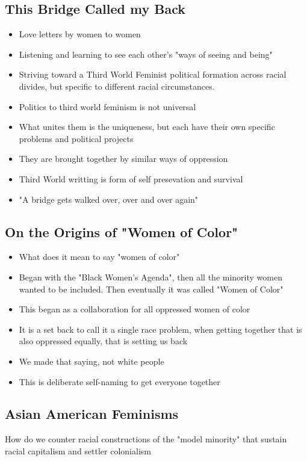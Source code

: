 \documentclass{article}
\begin{document}
\subsection{This Bridge Called my Back}
\begin{itemize}
  \item Love letters by women to women
  \item Listening and learning to see each other's "ways of seeing and being"
  \item Striving toward a Third World Feminist political formation across racial divides,
    but specific to different racial circumstances.
  \item Politics to third world feminism is not universal
  \item What unites them is the uniqueness, but each have their own
    specific problems and political projects
  \item They are brought together by similar ways of oppression
  \item Third World writting is form of self presevation and survival
  \item "A bridge gets walked over, over and over again"
\end{itemize}

\subsection{On the Origins of "Women of Color"}
\begin{itemize}
  \item What does it mean to say "women of color"
  \item Began with the "Black Women's Agenda", then 
    all the minority women wanted to be included. Then
    eventually it was called "Women of Color"
  \item This began as a collaboration for all oppressed women of color
  \item It is a set back to call it a single race problem, when getting
    together that is also oppressed equally, that is setting us back
  \item We made that saying, not white people
  \item This is deliberate self-naming to get everyone together
\end{itemize}

\subsection{Asian American Feminisms}
  How do we counter racial constructions of the
    "model minority" that sustain racial capitalism and settler colonialism
\end{document}
